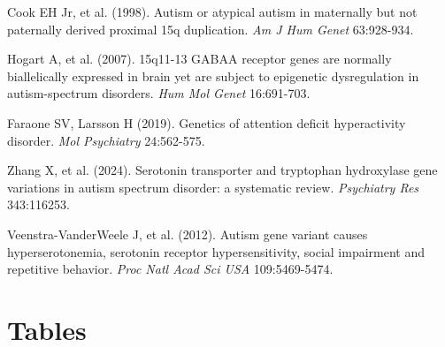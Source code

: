 \documentclass[12pt,letterpaper]{article}
\theoremstyle{definition}
\theoremstyle{remark}
\begin{document}
\begin{thebibliography}{99}
Cook EH Jr, et al. (1998). Autism or atypical autism in maternally but not paternally derived proximal 15q duplication. \textit{Am J Hum Genet} 63:928-934.

Hogart A, et al. (2007). 15q11-13 GABAA receptor genes are normally biallelically expressed in brain yet are subject to epigenetic dysregulation in autism-spectrum disorders. \textit{Hum Mol Genet} 16:691-703.

Faraone SV, Larsson H (2019). Genetics of attention deficit hyperactivity disorder. \textit{Mol Psychiatry} 24:562-575.

Zhang X, et al. (2024). Serotonin transporter and tryptophan hydroxylase gene variations in autism spectrum disorder: a systematic review. \textit{Psychiatry Res} 343:116253.

Veenstra-VanderWeele J, et al. (2012). Autism gene variant causes hyperserotonemia, serotonin receptor hypersensitivity, social impairment and repetitive behavior. \textit{Proc Natl Acad Sci USA} 109:5469-5474.

\end{thebibliography}

\newpage

\section*{Tables}
\end{document}

